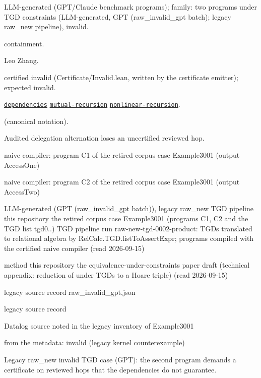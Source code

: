 \documentclass[10pt]{article}
\begin{document}
\begin{description}[leftmargin=2.6cm,style=nextline,itemsep=1pt]

\item[Category] LLM-generated (GPT/Claude benchmark programs); family: two programs under TGD constraints (LLM-generated, GPT (raw\_invalid\_gpt batch); legacy raw\_new pipeline), invalid.

\item[Kind] containment.

\item[Contributors] Leo Zhang.

\item[Status] certified invalid (Certificate/Invalid.lean, written by the certificate emitter); expected invalid.

\item[Tags] \hyperref[tag:dependencies]{\texttt{dependencies}} \hyperref[tag:mutual-recursion]{\texttt{mutual-recursion}} \hyperref[tag:nonlinear-recursion]{\texttt{nonlinear-recursion}}.

\item[Input]  (canonical notation).

\item[Summary] Audited delegation alternation loses an uncertified reviewed hop.

\item[Sides] naive compiler: program C1 of the retired corpus case Example3001 (output AccessOne) \par naive compiler: program C2 of the retired corpus case Example3001 (output AccessTwo)

\item[Sources] {\raggedright LLM-generated (GPT (raw\_invalid\_gpt batch)), legacy raw\_new TGD pipeline this repository the retired corpus case Example3001 (programs C1, C2 and the TGD list tgd0..) TGD pipeline run raw-new-tgd-0002-product: TGDs translated to relational algebra by RelCalc.TGD.listToAssertExpr; programs compiled with the certified naive compiler (read 2026-09-15) \par method this repository the equivalence-under-constraints paper draft (technical appendix: reduction of  under TGDs to a Hoare triple) (read 2026-09-15) \par legacy source record raw\_invalid\_gpt.json \par legacy source record  \par Datalog source noted in the legacy inventory of Example3001\par}

\item[Obstruction note] from the metadata: invalid (legacy kernel counterexample)

\item[Note] Legacy raw\_new invalid TGD case (GPT): the second program demands a certificate on reviewed hops that the dependencies do not guarantee.

\end{description}
\end{document}
